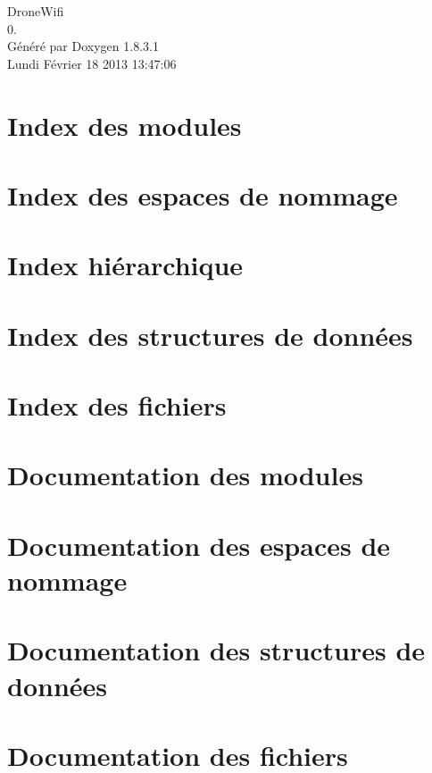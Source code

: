 \documentclass{book}
\begin{document}
\hypersetup{pageanchor=false,citecolor=blue}
\begin{titlepage}
\vspace*{7cm}
\begin{center}
{\Large Drone\-Wifi \\[1ex]\large 0. }\\
\vspace*{1cm}
{\large Généré par Doxygen 1.8.3.1}\\
\vspace*{0.5cm}
{\small Lundi Février 18 2013 13:47:06}\\
\end{center}
\end{titlepage}
\clearemptydoublepage
{}
\tableofcontents
\clearemptydoublepage
{}
\hypersetup{pageanchor=true,citecolor=blue}
\chapter{Index des modules}

\chapter{Index des espaces de nommage}

\chapter{Index hiérarchique}

\chapter{Index des structures de données}

\chapter{Index des fichiers}

\chapter{Documentation des modules}




\chapter{Documentation des espaces de nommage}

\chapter{Documentation des structures de données}







\chapter{Documentation des fichiers}








\printindex
\end{document}
